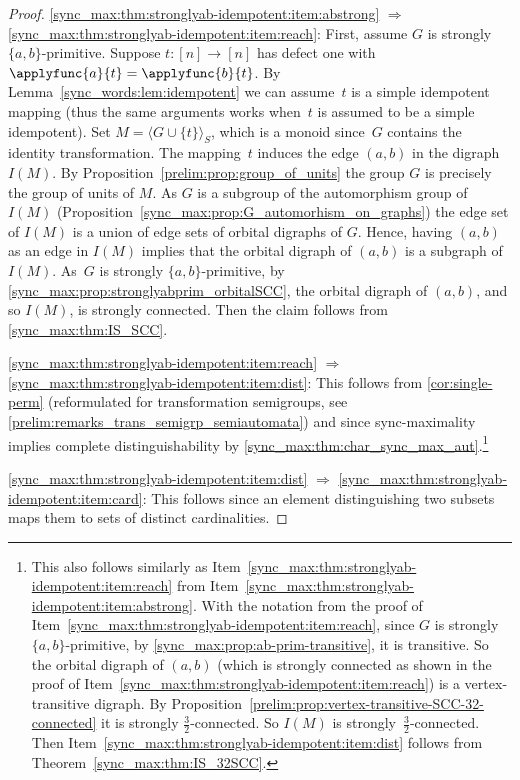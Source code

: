 \begin{proof}
\ref{sync_max:thm:stronglyab-idempotent:item:abstrong} $\Rightarrow$ \ref{sync_max:thm:stronglyab-idempotent:item:reach}: First, assume $G$ is strongly $\{a,b\}$-primitive. Suppose $t \colon [n] \to [n]$ 
has defect one with $\applyfunc{a}{t} = \applyfunc{b}{t}$.
By Lemma~\ref{sync_words:lem:idempotent} we can assume~$t$ is a simple idempotent mapping (thus the same arguments works when~$t$
is assumed to be a simple idempotent).
Set $M = \langle G \cup \{t\}\rangle_S$, which is a monoid since~$G$ contains the identity transformation.
The mapping~$t$ induces the edge $(a,b)$ in the digraph~$I(M)$.
By Proposition~\ref{prelim:prop:group_of_units} the group $G$ is precisely the group of units of $M$.
As $G$ is a subgroup of the automorphism group of~$I(M)$ (Proposition~\ref{sync_max:prop:G_automorhism_on_graphs})
the edge set of $I(M)$ is a union of edge sets of orbital digraphs of $G$.
Hence, having $(a,b)$ as an edge in $I(M)$ implies that the orbital digraph of $(a,b)$ is a subgraph of $I(M)$.
As~$G$ is strongly $\{a,b\}$-primitive, 
by \cref{sync_max:prop:stronglyabprim_orbitalSCC}, the orbital digraph of $(a,b)$, and so $I(M)$, is strongly connected.
Then the claim follows from \cref{sync_max:thm:IS_SCC}.

\ref{sync_max:thm:stronglyab-idempotent:item:reach} $\Rightarrow$ \ref{sync_max:thm:stronglyab-idempotent:item:dist}: This follows from \cref{cor:single-perm} (reformulated for transformation semigroups, see \cref{prelim:remarks_trans_semigrp_semiautomata})
 and since sync-maximality implies complete distinguishability by \cref{sync_max:thm:char_sync_max_aut}.\footnote{This also
 	follows similarly as Item~\ref{sync_max:thm:stronglyab-idempotent:item:reach} from Item~\ref{sync_max:thm:stronglyab-idempotent:item:abstrong}.
 	With the notation from the proof of Item~\ref{sync_max:thm:stronglyab-idempotent:item:reach}, 
 	since $G$ is strongly $\{a,b\}$-primitive, by \cref{sync_max:prop:ab-prim-transitive}, it is 
 	transitive. So the orbital digraph of $(a,b)$ (which is strongly connected as shown in the proof of Item~\ref{sync_max:thm:stronglyab-idempotent:item:reach})
 	is a vertex-transitive digraph.
 	By Proposition~\ref{prelim:prop:vertex-transitive-SCC-32-connected} 
 	it is strongly $\frac{3}{2}$-connected.
 	So $I(M)$ is strongly~$\frac{3}{2}$-connected. 
 	Then Item~\ref{sync_max:thm:stronglyab-idempotent:item:dist} follows from Theorem~\ref{sync_max:thm:IS_32SCC}.} 	

\ref{sync_max:thm:stronglyab-idempotent:item:dist} $\Rightarrow$ \ref{sync_max:thm:stronglyab-idempotent:item:card}: This follows
 since an element distinguishing two subsets maps them to sets of distinct cardinalities.
	

\end{proof}

